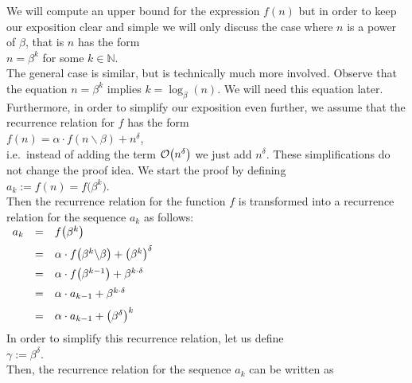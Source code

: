 \proof
We will compute an upper bound for the expression $f(n)$ but in order to keep our exposition clear
and simple we will only discuss the case where $n$ is a power of $\beta$, that is $n$ has the form
\\[0.2cm]
\hspace*{1.3cm}
$n = \beta^k$ \quad for some $k \in \mathbb{N}$.
\\[0.2cm]
The general case is similar, but is technically much more involved.
Observe that the equation $n = \beta^k$ implies $k = \log_{\beta}(n)$.  We will need this equation later. 
Furthermore, in order to simplify our exposition even further, we assume that the recurrence
relation for $f$ has the form 
\\[0.2cm]
\hspace*{1.3cm}
 $f(n) = \alpha \cdot f\left(n \backslash \beta\right) + n^\delta$,
\\[0.2cm]
i.e.~instead of adding the term $\mathcal{O}\bigl(n^\delta\bigr)$ we just add $n^\delta$.  These
simplifications do not change the proof idea.  We start the proof by defining
\\[0.2cm]
\hspace*{1.3cm}
 $a_k := f(n) = f\bigl(\beta^k\bigr)$.  
\\[0.2cm]
Then the recurrence relation for the function $f$
is transformed into a recurrence relation for the sequence $a_k$ as follows:
\\[0.2cm]
\hspace*{1.3cm}
$
\begin{array}[t]{lcl}
a_k & = & f\bigl(\beta^{k}\bigr)                                             \\[0.2cm]
    & = & \alpha \cdot f\bigl(\beta^{k} \backslash \beta\bigr) + \bigl(\beta^{k}\bigr)^\delta    \\[0.2cm]
    & = & \alpha \cdot f\bigl(\beta^{k-1}\bigr) + \beta^{k \cdot \delta}    \\[0.2cm]
    & = & \alpha \cdot a_{k-1} + \beta^{k \cdot \delta}    \\[0.2cm]
    & = & \alpha \cdot a_{k-1} + \bigl(\beta^{\delta}\bigr)^k    \\[0.2cm]
\end{array}
$
\\[0.2cm]
In order to simplify this recurrence relation, let us define
\\[0.2cm]
\hspace*{1.3cm}
$\gamma := \beta^{\delta}$.
\\[0.2cm]
Then, the recurrence relation for the sequence $a_k$ can be written as
